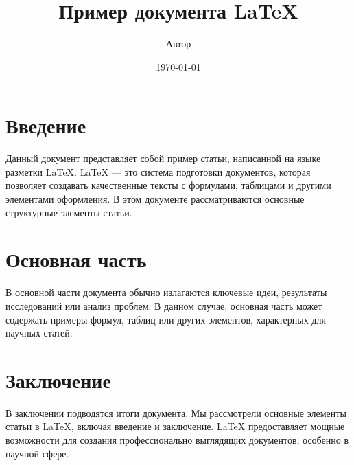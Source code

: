 \documentclass{article}
\title{Пример документа LaTeX}
\author{Автор}
\date{\today}
\begin{document}
\maketitle

\section{Введение}
Данный документ представляет собой пример статьи, написанной на языке разметки LaTeX. LaTeX — это система подготовки документов, которая позволяет создавать качественные тексты с формулами, таблицами и другими элементами оформления. В этом документе рассматриваются основные структурные элементы статьи.

\section{Основная часть}
В основной части документа обычно излагаются ключевые идеи, результаты исследований или анализ проблем. В данном случае, основная часть может содержать примеры формул, таблиц или других элементов, характерных для научных статей.

\section{Заключение}
В заключении подводятся итоги документа. Мы рассмотрели основные элементы статьи в LaTeX, включая введение и заключение. LaTeX предоставляет мощные возможности для создания профессионально выглядящих документов, особенно в научной сфере.
\end{document}
